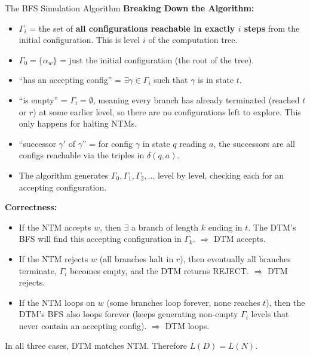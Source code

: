 \begin{definitionbox}{{The BFS Simulation Algorithm}}
\textbf{Breaking Down the Algorithm:}
\begin{itemize}[nosep]
\item $\Gamma_i$ = the set of \textbf{all configurations reachable in exactly
  $i$ steps} from the initial configuration. This is level $i$ of the
  computation tree.
\item $\Gamma_0 = \{\alpha_w\}$ = just the initial configuration (the root of
  the tree).
\item ``has an accepting config'' = $\exists \gamma \in \Gamma_i$ such that
  $\gamma$ is in state $t$.
\item ``is empty'' = $\Gamma_i = \emptyset$, meaning every branch has already
  terminated (reached $t$ or $r$) at some earlier level, so there are no
  configurations left to explore. This only happens for halting NTMs.
\item ``successor $\gamma'$ of $\gamma$'' = for config $\gamma$ in state $q$
  reading $a$, the successors are all configs reachable via the triples in
  $\delta(q, a)$.
\item The algorithm generates $\Gamma_0, \Gamma_1, \Gamma_2, \ldots$ level by
  level, checking each for an accepting configuration.
\end{itemize}

\textbf{Correctness:}
\begin{itemize}[nosep]
\item If the NTM accepts $w$, then $\exists$ a branch of length $k$ ending in
  $t$. The DTM's BFS will find this accepting configuration in $\Gamma_k$.
  $\Rightarrow$ DTM accepts.
\item If the NTM rejects $w$ (all branches halt in $r$), then eventually all
  branches terminate, $\Gamma_i$ becomes empty, and the DTM returns REJECT.
  $\Rightarrow$ DTM rejects.
\item If the NTM loops on $w$ (some branches loop forever, none reaches $t$),
  then the DTM's BFS also loops forever (keeps generating non-empty $\Gamma_i$
  levels that never contain an accepting config).
  $\Rightarrow$ DTM loops.
\end{itemize}

In all three cases, DTM matches NTM. Therefore $L(D) = L(N)$.
\end{definitionbox}

